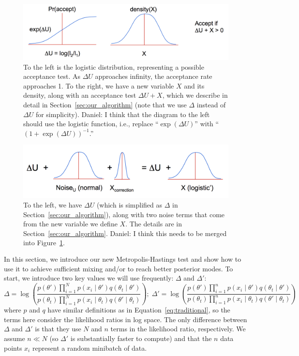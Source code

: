 \documentclass{article}
\begin{document}
\begin{figure}[t]
  \centering
  \includegraphics[width=\textwidth]{john_bair_fig01}
  \caption{
  To the left is the logistic distribution, representing a possible acceptance test. As $\Delta U$
  approaches infinity, the acceptance rate approaches 1. To the right, we have a new variable $X$
  and its density, along with an acceptance test $\Delta U + X$, which we describe in detail in
  Section~\ref{sec:our_algorithm} (note that we use $\Delta$ instead of $\Delta U$ for simplicity).
  {\color{blue}
  Daniel: I think that the diagram to the left should use the logistic function, i.e., replace
  ``$\exp(\Delta U)$'' with ``$(1+\exp(\Delta U))^{-1}$.''
  }
  }
  \label{fig:part1}
\end{figure}

\begin{figure}[t]
  \centering
  \includegraphics[width=\textwidth]{john_bair_fig02}
  \caption{
  To the left, we have $\Delta U$ (which is simplified as $\Delta$ in
  Section~\ref{sec:our_algorithm}), along with two noise terms that come from the new variable we
  define $X$. The details are in Section~\ref{sec:our_algorithm}.
  {\color{blue}
  Daniel: I think this needs to be merged into Figure~\ref{fig:part1}.
  }
  }
  \label{fig:part2}
\end{figure}

In this section, we introduce our new Metropolis-Hastings test and show how to use it to achieve
sufficient mixing and/or to reach better posterior modes. To start, we introduce two key values we
will use frequently: $\Delta$ and $\Delta'$:
\begin{equation}\label{eq:deltas}
\Delta = \log \left( \frac{p(\theta')  \prod_{i=1}^N p(x_i \mid \theta')  q(\theta_t \mid
\theta')}{p(\theta_t)\prod_{i=1}^N p(x_i \mid \theta_t)  q(\theta' \mid
\theta_t)} \right);\;  \Delta' = \log \left( \frac{p(\theta') \prod_{i=1}^n p(x_i \mid \theta') q(\theta_t \mid
\theta')}{p(\theta_t) \prod_{i=1}^n p(x_i \mid \theta_t) q(\theta' \mid
\theta_t)} \right)
\end{equation}
where $p$ and $q$ have similar definitions as in Equation~\ref{eq:traditional}, so the terms here
consider the likelihood ratios in log space. The only difference between $\Delta$ and $\Delta'$ is
that they use $N$ and $n$ terms in the likelihood ratio, respectively. We assume $n \ll N$ (so
$\Delta'$ is substantially faster to compute) and that the $n$ data points $x_i$ represent a random
minibatch of data.
\end{document}
